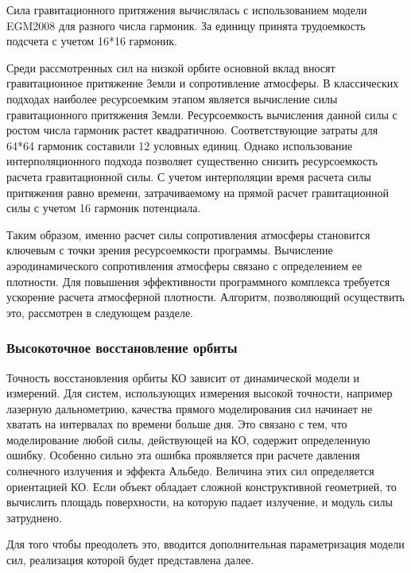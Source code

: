 Сила гравитационного притяжения вычислялась с использованием модели EGM2008 для
разного числа гармоник. За единицу принята трудоемкость подсчета с учетом 16*16 гармоник.

Среди рассмотренных сил на низкой орбите основной вклад вносят гравитационное притяжение Земли 
и сопротивление атмосферы.
В классических подходах наиболее ресурсоемким этапом является вычисление силы гравитационного 
притяжения Земли. Ресурсоемкость вычисления данной силы с ростом числа гармоник растет квадратичною.
Соответствующие затраты для 64*64 гармоник составили 12 условных единиц.
Однако использование интерполяционного подхода \cite{kuznetsov2023} позволяет существенно 
снизить ресурсоемкость расчета гравитационной силы. С учетом интерполяции время
расчета силы притяжения равно времени, затрачиваемому на прямой расчет гравитационной силы
с учетом 16 гармоник потенциала. 

Таким образом, именно расчет силы 
сопротивления атмосферы становится ключевым с точки зрения ресурсоемкости программы.
Вычисление аэродинамического сопротивления атмосферы связано 
с определением ее плотности.
Для повышения эффективности программного комплекса требуется ускорение расчета атмосферной плотности.
Алгоритм, позволяющий осуществить это, рассмотрен в следующем разделе.

\subsubsection{Высокоточное восстановление орбиты}
Точность восстановления орбиты КО зависит от динамической модели и измерений.
Для систем, использующих измерения высокой точности, например лазерную дальнометрию,
качества прямого моделирования сил начинает не хватать на интервалах по времени
больше дня. Это связано с тем, что моделирование
любой силы, действующей на КО, содержит определенную ошибку. Особенно сильно эта ошибка
проявляется при расчете давления солнечного излучения и эффекта Альбедо. Величина этих
сил определяется ориентацией КО. Если объект обладает сложной конструктивной геометрией,
то вычислить площадь поверхности, на которую падает излучение, и модуль силы затруднено. 

Для того чтобы преодолеть это, вводится дополнительная параметризация модели сил,
реализация которой будет представлена далее.